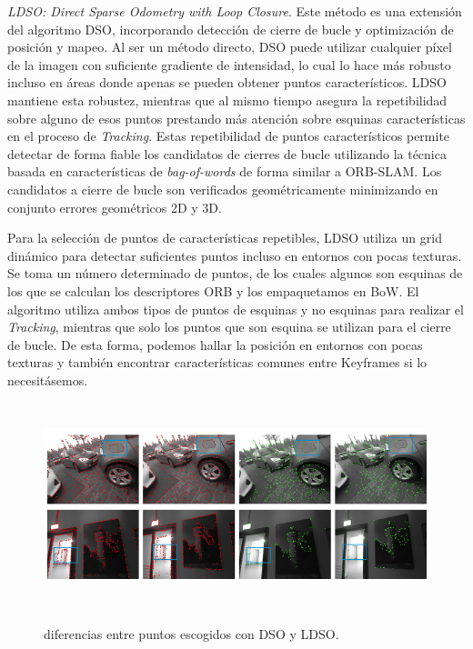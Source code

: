 \clearpage

\textit{LDSO: Direct Sparse Odometry with Loop Closure}. Este método es una extensión del algoritmo DSO, incorporando detección de cierre de bucle y optimización de posición y mapeo. Al ser un método directo, DSO puede utilizar cualquier píxel de la imagen con suficiente gradiente de intensidad, lo cual lo hace más robusto incluso en áreas donde apenas se pueden obtener puntos característicos. LDSO mantiene esta robustez, mientras que al mismo tiempo asegura la repetibilidad  sobre alguno de esos puntos prestando más atención sobre esquinas características en el proceso de \textit{Tracking}. Estas repetibilidad de puntos característicos permite detectar de forma fiable los candidatos de cierres de bucle utilizando la técnica basada en características de \textit{bag-of-words} de forma similar a ORB-SLAM. 
Los candidatos a cierre de bucle son verificados geométricamente minimizando en conjunto errores geométricos 2D y 3D.

Para la selección de puntos de características repetibles, LDSO utiliza un grid dinámico para detectar suficientes puntos incluso en entornos con pocas texturas. Se toma un número determinado de puntos, de los cuales algunos son esquinas de los que se calculan los descriptores ORB y los empaquetamos en BoW. El algoritmo  utiliza ambos tipos de puntos de esquinas y no esquinas para realizar el \textit{Tracking}, mientras que solo los puntos que son esquina se utilizan para el cierre de bucle. 
De esta forma, podemos hallar la posición en entornos con pocas texturas y también encontrar características comunes entre Keyframes si lo necesitásemos.

\begin{figure}[H]
\begin{center}
\label{fig:LDSO}\includegraphics[height=6.0cm]{img/cap4/LDSO.png}
\end{center}
\caption{diferencias entre puntos escogidos con DSO y LDSO.}
\end{figure}




